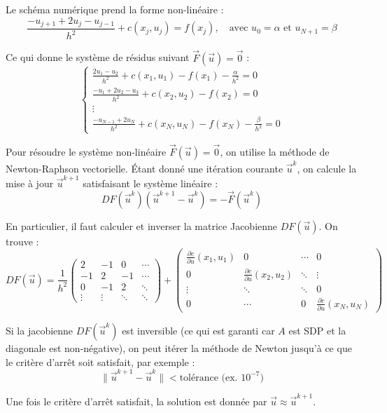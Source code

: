 Le schéma numérique prend la forme non-linéaire :
$$\frac{-u_{j+1} + 2u_j - u_{j-1}}{h^2} + c(x_j, u_j) = f(x_j), \quad \text{avec } u_0 = \alpha \text{ et } u_{N+1} = \beta$$

Ce qui donne le système de résidus suivant $\vec{F}(\vec{u}) = \vec{0}$ :
$$
\begin{cases}
\frac{2u_1 - u_2}{h^2} + c(x_1, u_1) - f(x_1) - \frac{\alpha}{h^2} = 0 \\
\frac{-u_1 + 2u_2 - u_3}{h^2} + c(x_2, u_2) - f(x_2) = 0 \\
\vdots \\
\frac{-u_{N-1} + 2u_N}{h^2} + c(x_N, u_N) - f(x_N) - \frac{\beta}{h^2} = 0
\end{cases}
$$

\begin{algorithme}
Pour résoudre le système non-linéaire $\vec{F}(\vec{u}) = \vec{0}$, on utilise la méthode de Newton-Raphson vectorielle.
Étant donné une itération courante $\vec{u}^k$, on calcule la mise à jour $\vec{u}^{k+1}$ satisfaisant le système linéaire :
$$DF(\vec{u}^k)(\vec{u}^{k+1} - \vec{u}^k) = -\vec{F}(\vec{u}^k)$$
\end{algorithme}

En particulier, il faut calculer et inverser la matrice Jacobienne $DF(\vec{u})$. On trouve :
$$
DF(\vec{u}) = \frac{1}{h^2}
\begin{pmatrix}
2 & -1 & 0 & \cdots \\
-1 & 2 & -1 & \cdots \\
0 & -1 & 2 & \ddots \\
\vdots & \vdots & \ddots & \ddots
\end{pmatrix}
+
\begin{pmatrix}
\frac{\partial c}{\partial u}(x_1, u_1) & 0 & \cdots & 0 \\
0 & \frac{\partial c}{\partial u}(x_2, u_2) & \ddots & \vdots \\
\vdots & \ddots & \ddots & 0 \\
0 & \cdots & 0 & \frac{\partial c}{\partial u}(x_N, u_N)
\end{pmatrix}
$$

Si la jacobienne $DF(\vec{u}^k)$ est inversible (ce qui est garanti car $A$ est SDP et la diagonale est non-négative), on peut itérer la méthode de Newton jusqu'à ce que le critère d'arrêt soit satisfait, par exemple :
$$\|\vec{u}^{k+1} - \vec{u}^k\| < \text{tolérance (ex. } 10^{-7}\text{)}$$

Une fois le critère d'arrêt satisfait, la solution est donnée par $\vec{u} \approx \vec{u}^{k+1}$.